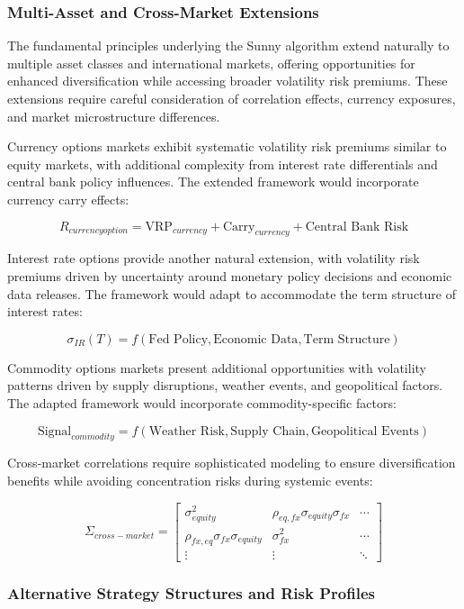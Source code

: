 \documentclass[
  american,
  11pt,
  11pt,
  letterpaper,
  onecolumn]{article}
\begin{document}
\subsubsection{Multi-Asset and Cross-Market
Extensions}\label{multi-asset-and-cross-market-extensions}

The fundamental principles underlying the Sunny algorithm extend
naturally to multiple asset classes and international markets, offering
opportunities for enhanced diversification while accessing broader
volatility risk premiums. These extensions require careful consideration
of correlation effects, currency exposures, and market microstructure
differences.

Currency options markets exhibit systematic volatility risk premiums
similar to equity markets, with additional complexity from interest rate
differentials and central bank policy influences. The extended framework
would incorporate currency carry effects:

\[R_{currency option} = \text{VRP}_{currency} + \text{Carry}_{currency} + \text{Central Bank Risk}\]

Interest rate options provide another natural extension, with volatility
risk premiums driven by uncertainty around monetary policy decisions and
economic data releases. The framework would adapt to accommodate the
term structure of interest rates:

\[\sigma_{IR}(T) = f(\text{Fed Policy}, \text{Economic Data}, \text{Term Structure})\]

Commodity options markets present additional opportunities with
volatility patterns driven by supply disruptions, weather events, and
geopolitical factors. The adapted framework would incorporate
commodity-specific factors:

\[\text{Signal}_{commodity} = f(\text{Weather Risk}, \text{Supply Chain}, \text{Geopolitical Events})\]

Cross-market correlations require sophisticated modeling to ensure
diversification benefits while avoiding concentration risks during
systemic events:

\[\Sigma_{cross-market} = \begin{bmatrix}
\sigma_{equity}^2 & \rho_{eq,fx}\sigma_{equity}\sigma_{fx} & \cdots \\
\rho_{fx,eq}\sigma_{fx}\sigma_{equity} & \sigma_{fx}^2 & \cdots \\
\vdots & \vdots & \ddots
\end{bmatrix}\]

\subsubsection{Alternative Strategy Structures and Risk
Profiles}\label{alternative-strategy-structures-and-risk-profiles}
\end{document}
